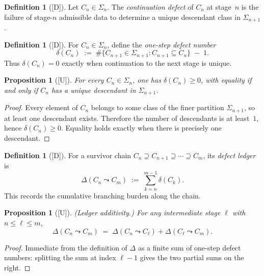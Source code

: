 \documentclass[12pt,oneside]{amsbook}
\theoremstyle{plain}
\newtheorem{proposition}[theorem]{Proposition}
\theoremstyle{definition}
\newtheorem{definition}[theorem]{Definition}
\theoremstyle{remark}
\newcommand{\status}[1]{\textup{[#1]}}
\begin{document}
\begin{definition}[\status{D}]\label{def:continuation-defect}
Let $C_n \in \Sigma_n$.  The \emph{continuation defect} of $C_n$ at
stage~$n$ is the failure of stage-$n$ admissible data to determine a
unique descendant class in $\Sigma_{n+1}$.
\end{definition}

\begin{definition}[\status{D}]\label{def:one-step-defect}
For $C_n \in \Sigma_n$, define the \emph{one-step defect number}
\[
  \delta(C_n) \;:=\; \#\{C_{n+1} \in \Sigma_{n+1} : C_{n+1} \subseteq C_n\}
  \;-\; 1.
\]
Thus $\delta(C_n) = 0$ exactly when continuation to the next stage is
unique.
\end{definition}

\begin{proposition}[\status{U}]\label{prop:defect-nonneg}
For every $C_n \in \Sigma_n$, one has $\delta(C_n) \geq 0$, with
equality if and only if $C_n$ has a unique descendant in $\Sigma_{n+1}$.
\end{proposition}

\begin{proof}
Every element of $C_n$ belongs to some class of the finer partition
$\Sigma_{n+1}$, so at least one descendant exists.  Therefore the
number of descendants is at least~$1$, hence $\delta(C_n) \geq 0$.
Equality holds exactly when there is precisely one descendant.
\end{proof}

\begin{definition}[\status{D}]\label{def:defect-ledger}
For a survivor chain $C_n \supseteq C_{n+1} \supseteq \cdots
\supseteq C_m$, its \emph{defect ledger} is
\[
  \Delta(C_n \leadsto C_m) \;:=\; \sum_{k=n}^{m-1} \delta(C_k).
\]
This records the cumulative branching burden along the chain.
\end{definition}

\begin{proposition}[\status{U}]\label{prop:ledger-additivity}
\textup{(Ledger additivity.)}  For any intermediate stage $\ell$ with
$n \leq \ell \leq m$,
\[
  \Delta(C_n \leadsto C_m)
  \;=\;
  \Delta(C_n \leadsto C_\ell) + \Delta(C_\ell \leadsto C_m).
\]
\end{proposition}

\begin{proof}
Immediate from the definition of $\Delta$ as a finite sum of one-step
defect numbers: splitting the sum at index $\ell-1$ gives the two
partial sums on the right.
\end{proof}
\end{document}
